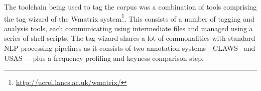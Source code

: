 The toolchain being used to tag the corpus was a combination of tools comprising the tag wizard of the Wmatrix system\footnote{\url{http://ucrel.lancs.ac.uk/wmatrix/}}.  
This consists of a number of tagging and analysis tools, each communicating using intermediate files and managed using a series of shell scripts.  
The tag wizard shares a lot of commonalities with standard NLP processing pipelines as it consists of two annotation systems---CLAWS~\cite{garside1997hybrid} and USAS~\cite{rayson2004ucrel}---plus a frequency profiling and keyness comparison step.

